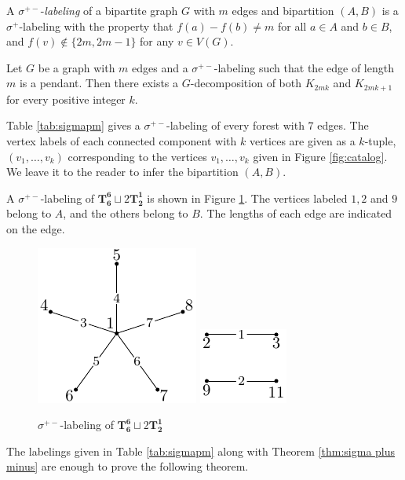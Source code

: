 \documentclass{dmgt}
\begin{document}
\begin{dnt} \label{def:sigma plus minus} 
A $\sigma^{+-}$-\emph{labeling} of a bipartite graph $G$ with $m$ edges and bipartition $(A,B)$ is a $\sigma^+$-labeling with the property that $f(a) - f(b) \neq m$ for all $a \in A$ and $b \in B$, and $f(v) \not\in \{2m,2m-1\}$ for any $v\in V(G)$.
\end{dnt}

\begin{theorem} \label{thm:sigma plus minus} 
Let $G$ be a graph with $m$ edges and a $\sigma^{+-}$-labeling such that the edge of length $m$ is a pendant. Then there exists a $G$-decomposition of both $K_{2mk}$ and $K_{2mk+1}$ for every positive integer $k$.
\end{theorem}

Table \ref{tab:sigmapm} gives a $\sigma^{+-}$-labeling of every forest with 7 edges. The vertex labels of each connected component with $k$ vertices are given as a $k$-tuple, $(v_1,\dots ,v_k)$ corresponding to the vertices $v_1, \dots, v_k$ given in Figure \ref{fig:catalog}. We leave it to the reader to infer the bipartition $(A,B)$. 
\begin{exm}
    A $\sigma^{+-}$-labeling of $\mathbf{T_{6}^{6}}\sqcup 2\mathbf{T_{2}^{1}}$ is shown in Figure \ref{fig:sigma label ex}. The vertices labeled $1,2$ and $9$ belong to $A$, and the others belong to $B$. The lengths of each edge are indicated on the edge.
    \begin{figure}[H]
        \centering
        \includegraphics[scale=1.0]{sigma label ex1.pdf}
         \includegraphics[scale=1.0]{sigma label ex2.pdf}
        \caption{$\sigma^{+-}$-labeling of $\mathbf{T_{6}^{6}}\sqcup 2\mathbf{T_{2}^{1}}$}
        \label{fig:sigma label ex}
    \end{figure}
\end{exm}
 The labelings given in Table \ref{tab:sigmapm} along with Theorem \ref{thm:sigma plus minus} are enough to prove the following theorem. \newpage
\end{document}
